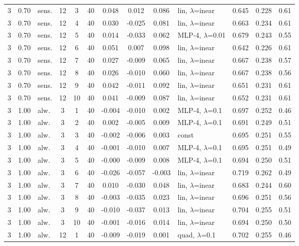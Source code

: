 \begin{scriptsize}
\begin{longtable}{cclcc c ccc l ccc}
3 & 0.70 & sens. & 12 & 3 & 40 & 0.048 & 0.012 & 0.086 & lin, $\lambda$=inear & 0.645 & 0.228 & 0.61 \\
3 & 0.70 & sens. & 12 & 4 & 40 & 0.030 & -0.025 & 0.081 & lin, $\lambda$=inear & 0.663 & 0.234 & 0.61 \\
3 & 0.70 & sens. & 12 & 5 & 40 & 0.014 & -0.033 & 0.062 & MLP-4, $\lambda$=0.01 & 0.679 & 0.243 & 0.55 \\
3 & 0.70 & sens. & 12 & 6 & 40 & 0.051 & 0.007 & 0.098 & lin, $\lambda$=inear & 0.642 & 0.226 & 0.61 \\
3 & 0.70 & sens. & 12 & 7 & 40 & 0.027 & -0.009 & 0.065 & lin, $\lambda$=inear & 0.667 & 0.238 & 0.57 \\
3 & 0.70 & sens. & 12 & 8 & 40 & 0.026 & -0.010 & 0.060 & lin, $\lambda$=inear & 0.667 & 0.238 & 0.56 \\
3 & 0.70 & sens. & 12 & 9 & 40 & 0.042 & -0.011 & 0.092 & lin, $\lambda$=inear & 0.651 & 0.231 & 0.61 \\
3 & 0.70 & sens. & 12 & 10 & 40 & 0.041 & -0.009 & 0.087 & lin, $\lambda$=inear & 0.652 & 0.231 & 0.61 \\
3 & 1.00 & alw. & 3 & 1 & 40 & -0.004 & -0.010 & 0.002 & MLP-4, $\lambda$=0.1 & 0.697 & 0.252 & 0.46 \\
3 & 1.00 & alw. & 3 & 2 & 40 & 0.002 & -0.005 & 0.009 & MLP-4, $\lambda$=0.1 & 0.691 & 0.249 & 0.51 \\
3 & 1.00 & alw. & 3 & 3 & 40 & -0.002 & -0.006 & 0.003 & const & 0.695 & 0.251 & 0.55 \\
3 & 1.00 & alw. & 3 & 4 & 40 & -0.001 & -0.010 & 0.007 & MLP-4, $\lambda$=0.1 & 0.695 & 0.251 & 0.49 \\
3 & 1.00 & alw. & 3 & 5 & 40 & -0.000 & -0.009 & 0.008 & MLP-4, $\lambda$=0.1 & 0.694 & 0.250 & 0.51 \\
3 & 1.00 & alw. & 3 & 6 & 40 & -0.026 & -0.057 & -0.003 & lin, $\lambda$=inear & 0.719 & 0.262 & 0.49 \\
3 & 1.00 & alw. & 3 & 7 & 40 & 0.010 & -0.030 & 0.048 & lin, $\lambda$=inear & 0.683 & 0.244 & 0.60 \\
3 & 1.00 & alw. & 3 & 8 & 40 & -0.003 & -0.035 & 0.023 & lin, $\lambda$=inear & 0.696 & 0.251 & 0.56 \\
3 & 1.00 & alw. & 3 & 9 & 40 & -0.010 & -0.037 & 0.013 & lin, $\lambda$=inear & 0.704 & 0.255 & 0.51 \\
3 & 1.00 & alw. & 3 & 10 & 40 & -0.001 & -0.016 & 0.014 & lin, $\lambda$=inear & 0.694 & 0.250 & 0.50 \\
3 & 1.00 & alw. & 12 & 1 & 40 & -0.009 & -0.019 & 0.001 & quad, $\lambda$=0.1 & 0.702 & 0.255 & 0.46 \\

\end{longtable}
\end{scriptsize}
